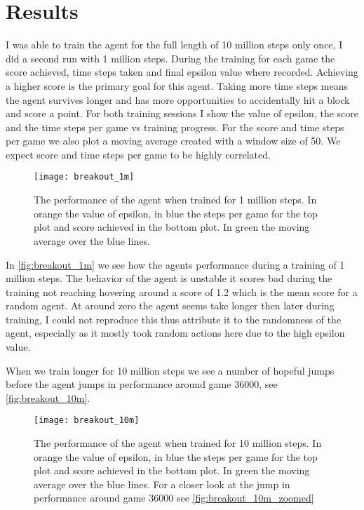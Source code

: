 \section{Results}
I was able to train the agent for the full length of 10 million steps only once, I did a second run with 1 million steps. During the training for each game the score achieved, time steps taken and final epsilon value where recorded. Achieving a higher score is the primary goal for this agent. Taking more time steps means the agent survives longer and has more opportunities to accidentally hit a block and score a point. For both training sessions I show the value of epsilon, the score and the time steps per game vs training progress. For the score and time steps per game we also plot a moving average created with a window size of 50. We expect score and time steps per game to be highly correlated. 

\begin{figure}
    \texttt{[image: breakout\_1m]}
    \caption{The performance of the agent when trained for 1 million steps. In orange the value of epsilon, in blue the steps per game for the top plot and score achieved in the bottom plot. In green the moving average over the blue lines.}
    \label{fig:breakout_1m}
\end{figure}

In \autoref{fig:breakout_1m} we see how the agents performance during a training of 1 million steps. The behavior of the agent is unstable it scores bad during the training not reaching hovering around a score of 1.2 which is the mean score for a random agent\cite{atari}. At around zero the agent seems take longer then later during training, I could not reproduce this thus attribute it to the randomness of the agent, especially as it mostly took random actions here due to the high epsilon value. 

When we train longer for 10 million steps we see a number of hopeful jumps before the agent jumps in performance around game $36000$, see \autoref{fig:breakout_10m}. 

\begin{figure}
    \texttt{[image: breakout\_10m]}
    \caption{The performance of the agent when trained for 10 million steps. In orange the value of epsilon, in blue the steps per game for the top plot and score achieved in the bottom plot. In green the moving average over the blue lines. For a closer look at the jump in performance around game $36000$ see \autoref{fig:breakout_10m_zoomed}}
    \label{fig:breakout_10m}
\end{figure}

